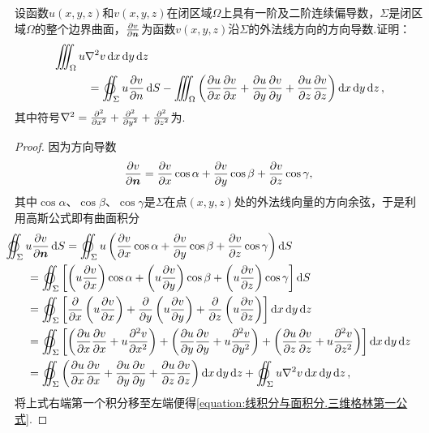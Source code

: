 \begin{example}[三维格林第一公式]
设函数\(u(x,y,z)\)和\(v(x,y,z)\)在闭区域\(\Omega\)上具有一阶及二阶连续偏导数，\(\Sigma\)是闭区域\(\Omega\)的整个边界曲面，\(\pdv{v}{\boldsymbol{n}}\)为函数\(v(x,y,z)\)沿\(\Sigma\)的外法线方向的方向导数.证明：
\begin{equation}\label{equation:线积分与面积分.三维格林第一公式}
\begin{split}
&\iiint_{\Omega} u \laplacian{v} \dd{x}\dd{y}\dd{z} \\
&\hspace{30pt}=\varoiint_\Sigma u \pdv{v}{n} \dd{S}
-\iiint_{\Omega} \left(
\pdv{u}{x} \pdv{v}{x}
+\pdv{u}{y} \pdv{v}{y}
+\pdv{u}{z} \pdv{v}{z}
\right) \dd{x}\dd{y}\dd{z},
\end{split}
\end{equation}其中符号\(\laplacian = \pdv[2]{x} + \pdv[2]{y} + \pdv[2]{z}\)为.
\begin{proof}
因为方向导数\[
\pdv{v}{\boldsymbol{n}}
= \pdv{v}{x} \cos\alpha
+ \pdv{v}{y} \cos\beta
+ \pdv{v}{z} \cos\gamma,
\]其中\(\cos\alpha\)、\(\cos\beta\)、\(\cos\gamma\)是\(\Sigma\)在点\((x,y,z)\)处的外法线向量的方向余弦，于是利用高斯公式即有曲面积分\begin{align*}
&\hspace{-20pt}\varoiint_\Sigma u \pdv{v}{\vb{n}} \dd{S}
= \varoiint_\Sigma u \left(
\pdv{v}{x} \cos\alpha
+ \pdv{v}{y} \cos\beta
+ \pdv{v}{z} \cos\gamma
\right) \dd{S} \\
&= \varoiint_\Sigma \left[
\left( u \pdv{v}{x} \right) \cos\alpha
+ \left( u \pdv{v}{y} \right) \cos\beta
+ \left( u \pdv{v}{z} \right) \cos\gamma
\right] \dd{S} \\
&= \varoiint_\Sigma \left[
\pdv{x} \left( u \pdv{v}{x} \right)
+ \pdv{y} \left( u \pdv{v}{y} \right)
+ \pdv{z} \left( u \pdv{v}{z} \right)
\right] \dd{x}\dd{y}\dd{z} \\
&= \varoiint_\Sigma \left[
\left( \pdv{u}{x} \pdv{v}{x} + u \pdv[2]{v}{x} \right)
+ \left( \pdv{u}{y} \pdv{v}{y} + u \pdv[2]{v}{y} \right)
+ \left( \pdv{u}{z} \pdv{v}{z} + u \pdv[2]{v}{z} \right)
\right] \dd{x}\dd{y}\dd{z} \\
&= \varoiint_\Sigma \left(
\pdv{u}{x} \pdv{v}{x}
+ \pdv{u}{y} \pdv{v}{y}
+ \pdv{u}{z} \pdv{v}{z}
\right) \dd{x}\dd{y}\dd{z}
+ \varoiint_\Sigma u \laplacian{v} \dd{x}\dd{y}\dd{z},
\end{align*}将上式右端第一个积分移至左端便得\cref{equation:线积分与面积分.三维格林第一公式}.
\end{proof}
\end{example}
